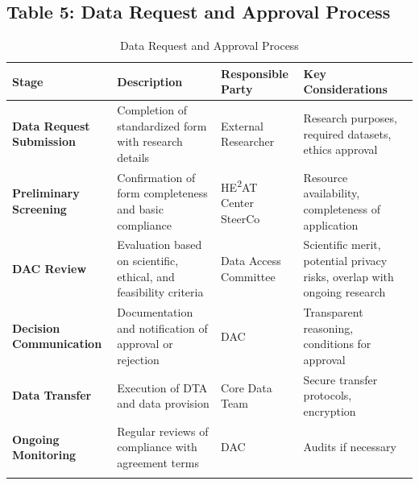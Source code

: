 \graphicspath{{./}{./sections/images/}{./images/}}\documentclass[12pt,a4paper,landscape]{article}
\begin{document}
\subsection*{Table 5: Data Request and Approval Process}
\begin{longtable}{L{3.5cm}L{6cm}L{4.5cm}L{5.5cm}}
\toprule
\textbf{Stage} & \textbf{Description} & \textbf{Responsible Party} & \textbf{Key Considerations} \\
\midrule
\endhead

\textbf{Data Request Submission} 
& Completion of standardized form with research details 
& External Researcher 
& Research purposes, required datasets, ethics approval \\
\midrule

\textbf{Preliminary Screening} 
& Confirmation of form completeness and basic compliance 
& HE\textsuperscript{2}AT Center SteerCo 
& Resource availability, completeness of application \\
\midrule

\textbf{DAC Review} 
& Evaluation based on scientific, ethical, and feasibility criteria 
& Data Access Committee 
& Scientific merit, potential privacy risks, overlap with ongoing research \\
\midrule

\textbf{Decision Communication} 
& Documentation and notification of approval or rejection 
& DAC 
& Transparent reasoning, conditions for approval \\
\midrule

\textbf{Data Transfer} 
& Execution of DTA and data provision 
& Core Data Team 
& Secure transfer protocols, encryption \\
\midrule

\textbf{Ongoing Monitoring} 
& Regular reviews of compliance with agreement terms 
& DAC 
& Audits if necessary \\
\bottomrule
\caption{Data Request and Approval Process}
\end{longtable}

\end{document}
